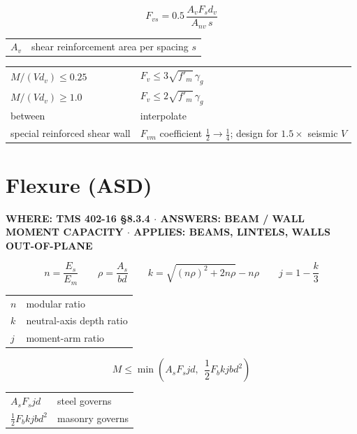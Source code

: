 \documentclass[10pt]{article}
\begin{document}
\begin{equation}
F_{vs} = 0.5\,\frac{A_v F_s d_v}{A_{nv}\, s}
\end{equation}
{\ttfamily\footnotesize \begin{tabular}{@{}ll@{}}
$A_v$ & shear reinforcement area per spacing $s$\\
\end{tabular}}


{\ttfamily\footnotesize \begin{tabular}{@{}ll@{}}
$M/(Vd_v) \le 0.25$ & $F_v \le 3\sqrt{f'_m}\,\gamma_g$\\
$M/(Vd_v) \ge 1.0$ & $F_v \le 2\sqrt{f'_m}\,\gamma_g$\\
between & interpolate\\
special reinforced shear wall & $F_{vm}$ coefficient $\frac{1}{2} \to \frac{1}{4}$; design for $1.5\times$ seismic $V$\\
\end{tabular}}

\section{Flexure (ASD)}

{\ttfamily\footnotesize\bfseries WHERE: TMS 402-16 \S 8.3.4 $\cdot$ ANSWERS: BEAM / WALL MOMENT CAPACITY $\cdot$ APPLIES: BEAMS, LINTELS, WALLS OUT-OF-PLANE}

\begin{equation}
n = \frac{E_s}{E_m} \qquad \rho = \frac{A_s}{bd} \qquad k = \sqrt{(n\rho)^2 + 2n\rho} - n\rho \qquad j = 1 - \frac{k}{3}
\end{equation}
{\ttfamily\footnotesize \begin{tabular}{@{}ll@{}}
$n$ & modular ratio\\
$k$ & neutral-axis depth ratio\\
$j$ & moment-arm ratio\\
\end{tabular}}

\begin{equation}
M \le \min\left( A_s F_s j d,\ \ \frac{1}{2} F_b k j b d^2 \right)
\end{equation}
{\ttfamily\footnotesize \begin{tabular}{@{}ll@{}}
$A_s F_s j d$ & steel governs\\
$\frac{1}{2}F_b kjbd^2$ & masonry governs\\
\end{tabular}}
\end{document}
